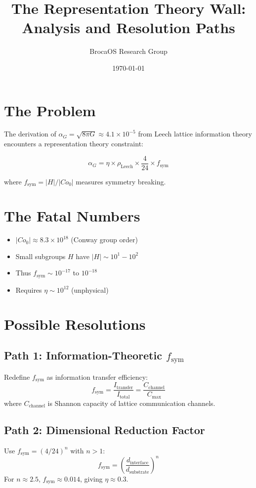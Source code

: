 \documentclass[11pt]{article}
\title{The Representation Theory Wall: Analysis and Resolution Paths}
\author{BrocaOS Research Group}
\date{\today}
\begin{document}
\maketitle

\section{The Problem}

The derivation of $\alpha_G = \sqrt{8\pi G} \approx 4.1\times10^{-5}$ from
Leech lattice information theory encounters a representation theory constraint:

\begin{equation}
\alpha_G = \eta \times \rho_{\text{Leech}} \times \frac{4}{24} \times f_{\text{sym}}
\end{equation}

where $f_{\text{sym}} = |H|/|Co_0|$ measures symmetry breaking.

\section{The Fatal Numbers}

\begin{itemize}
\item $|Co_0| \approx 8.3\times 10^{18}$ (Conway group order)
\item Small subgroups $H$ have $|H| \sim 10^1-10^2$
\item Thus $f_{\text{sym}} \sim 10^{-17}$ to $10^{-18}$
\item Requires $\eta \sim 10^{12}$ (unphysical)
\end{itemize}

\section{Possible Resolutions}

\subsection{Path 1: Information-Theoretic $f_{\text{sym}}$}
Redefine $f_{\text{sym}}$ as information transfer efficiency:
\begin{equation}
f_{\text{sym}} = \frac{I_{\text{transfer}}}{I_{\text{total}}} = \frac{C_{\text{channel}}}{C_{\text{max}}}
\end{equation}
where $C_{\text{channel}}$ is Shannon capacity of lattice communication channels.

\subsection{Path 2: Dimensional Reduction Factor}
Use $f_{\text{sym}} = (4/24)^n$ with $n > 1$:
\begin{equation}
f_{\text{sym}} = \left(\frac{d_{\text{interface}}}{d_{\text{substrate}}}\right)^n
\end{equation}
For $n \approx 2.5$, $f_{\text{sym}} \approx 0.014$, giving $\eta \approx 0.3$.
\end{document}
